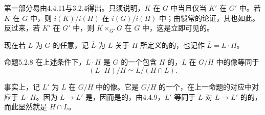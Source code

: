 第一部分易由4.4.11与3.2.4得出。只须说明，$K$ 在 $G$ 中当且仅当 $K'$ 在 $G'$ 中。若 $K$ 在 $G$ 中，则 $i(K)/i(H)$ 在 $i(G)/i(H)$ 中；由惯常的论证，其也如此。反过来，若 $K'$ 在 $G'$ 中，则 $K\times_{G'}G$ 在 $G$ 中，这是立即可见的。

现在若 $L$ 为 $G$ 的任意，记 $\overline L$ 为 $L$ 关于 $H$ 所定义的的，也记作 $\overline L=L\cdot H$。
\begin{SGAresult}{命题}{5.2.8}
在上述条件下，$L\cdot H$ 是 $G$ 的一个包含 $H$ 的，$L$ 在 $G/H$ 中的像等同于
\[
(L\cdot H)/H\simeq L/(H\cap L).
\]
\end{SGAresult}
事实上，记 $L'$ 为 $L$ 在 $G/H$ 中的像。它是 $G/H$ 的一个，在上一命题的对应中对应于 $L\cdot H$。因为 $L\to L'$ 是，因而是的，由4.4.9，$L'$ 等同于 $L$ 对 $L\to L'$ 的的，而此显然就是 $H\cap L$。

